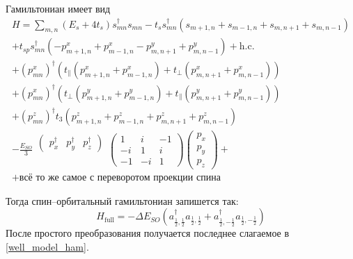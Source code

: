 Гамильтониан имеет вид
\begin{multline}
   \label{well_model_ham}
   H  = \sum_{m,n} (E_s + 4t_s) s_{mn}^{\dagger} s_{mn} - t_s s_{mn}^{\dagger}
                          (s_{m+1,n} + s_{m-1,n} + s_{m,n+1} + s_{m,n-1}) \\
          + t_{sp} s_{mn}^{\dagger} (-p_{m+1,n}^x + p_{m-1,n}^x - p^y_{m,n+1} + p^y_{m,n-1})
                                                                + \mathrm{h.c.}  \\
          + (p_{mn}^x)^{\dagger}(t_{\parallel}(p_{m+1,n}^x + p_{m-1,n}^x) +
                                 t_{\perp} (p^x_{m,n+1} + p^x_{m,n-1})) \\
          + (p_{mn}^x)^{\dagger}(t_{\perp}(p_{m+1,n}^y + p_{m-1,n}^y) +
                                 t_{\parallel} (p^y_{m,n+1} + p^y_{m,n-1})) \\
          + (p_{mn}^z)^{\dagger} t_3 (p_{m+1,n}^z + p_{m-1,n}^z +
                                p^z_{m,n+1} + p^z_{m,n-1}) \\
          -\frac{E_{SO}}{3}
                \begin{matrix}
                    \left(\begin{matrix}
                        p_x^\dagger & p_y^\dagger & p_z^\dagger
                    \end{matrix}\right) \\
                    \\
                    \\
                \end{matrix}
        		\left(\begin{matrix}
        			1 & i & -1 \\
        			-i & 1 & i \\
        			-1 & -i & 1
        		\end{matrix} \right)
                \left(\begin{matrix}
                    p_x \\ 
                    p_y \\
                    p_z
                \end{matrix}\right) + \\
        + \text{всё то же самое с переворотом проекции спина}
\end{multline}

Тогда спин--орбитальный гамильтониан запишется так:
\begin{equation}
	H_{\mathrm{full}} = -\Delta E_{SO} 
			(a_{\frac{1}{2}, \frac{1}{2}}^\dagger a_{\frac{1}{2}, \frac{1}{2}} +
			a_{\frac{1}{2}, -\frac{1}{2}}^\dagger a_{\frac{1}{2}, -\frac{1}{2}})
\end{equation}
После простого преобразования получается последнее слагаемое в \eqref{well_model_ham}.
